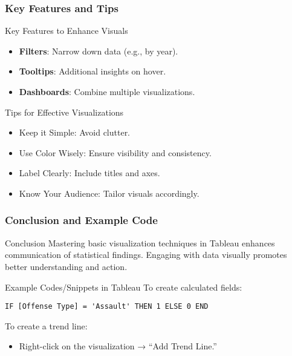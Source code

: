 \documentclass[aspectratio=169]{beamer}
\begin{document}
\begin{frame}[fragile]
    \frametitle{Key Features and Tips}
    \begin{block}{Key Features to Enhance Visuals}
        \begin{itemize}
            \item \textbf{Filters}: Narrow down data (e.g., by year).
            \item \textbf{Tooltips}: Additional insights on hover.
            \item \textbf{Dashboards}: Combine multiple visualizations.
        \end{itemize}
    \end{block}

    \begin{block}{Tips for Effective Visualizations}
        \begin{itemize}
            \item Keep it Simple: Avoid clutter.
            \item Use Color Wisely: Ensure visibility and consistency.
            \item Label Clearly: Include titles and axes.
            \item Know Your Audience: Tailor visuals accordingly.
        \end{itemize}
    \end{block}
\end{frame}

\begin{frame}[fragile]
    \frametitle{Conclusion and Example Code}
    \begin{block}{Conclusion}
        Mastering basic visualization techniques in Tableau enhances communication of statistical findings. Engaging with data visually promotes better understanding and action.
    \end{block}
    
    \begin{block}{Example Codes/Snippets in Tableau}
        To create calculated fields: 
        \begin{lstlisting}
IF [Offense Type] = 'Assault' THEN 1 ELSE 0 END
        \end{lstlisting}
        To create a trend line:
        \begin{itemize}
            \item Right-click on the visualization → “Add Trend Line.”
        \end{itemize}
    \end{block}
\end{frame}
\end{document}
